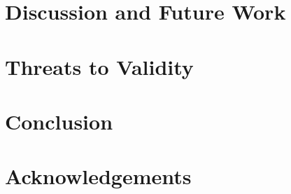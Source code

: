 \documentclass[conference]{IEEEtran}
\begin{document}
\section{Discussion and Future Work}



\section{Threats to Validity}



\section{Conclusion}



\section{Acknowledgements}






\end{document}
